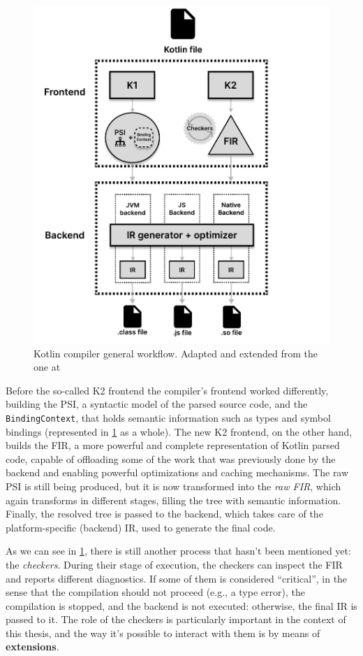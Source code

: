 \documentclass[12pt,a4paper,openright,twoside]{book}
\begin{document}
\begin{figure}
  \centering
  \includegraphics[width=.8\linewidth]{figures/kotlin-compiler-workflow.pdf}
  \caption{Kotlin compiler general workflow. Adapted and extended from the one
  at \cite{moskala2023}}
  \label{fig:kotlin-compiler-workflow}
\end{figure}

Before the so-called K2 frontend the compiler's frontend worked differently,
building the \ac{PSI}, a syntactic model of the parsed source code, and the
\lstinline{BindingContext}, that holds semantic information such as types and
symbol bindings (represented in \cref{fig:kotlin-compiler-workflow} as a whole). 
%
The new K2 frontend, on the other hand, builds the \ac{FIR}, a more powerful and
complete representation of Kotlin parsed code, capable of offloading some of the
work that was previously done by the backend and enabling powerful optimizations
and caching mechanisms. The raw \ac{PSI} is still being produced, but it is now
transformed into the \emph{raw FIR}, which again transforms in different stages,
filling the tree with semantic information. Finally, the resolved tree is passed
to the backend, which takes care of the platform-specific (backend) \ac{IR}, used
to generate the final code.

As we can see in \cref{fig:kotlin-compiler-workflow}, there is still another
process that hasn't been mentioned yet: the \emph{checkers}. During their stage
of execution, the checkers can inspect the \ac{FIR} and reports different
diagnostics. If some of them is considered ``critical'', in the sense that the
compilation should not proceed (e.g., a type error), the compilation is stopped,
and the backend is not executed: otherwise, the final \ac{IR} is passed to it.
%
The role of the checkers is particularly important in the context of this
thesis, and the way it's possible to interact with them is by means of
\textbf{extensions}.
\end{document}
